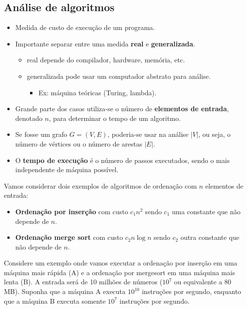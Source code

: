 \subsection{Análise de algoritmos}

\begin{itemize}
\item Medida de custo de execução de um programa.
\item Importante separar entre uma medida {\bf real}  e {\bf generalizada}.
	\begin{itemize}
	\item real depende do compilador, hardware, memória, etc.
	\item generalizada pode usar um computador abstrato para análise.
		\begin{itemize}
		\item Ex: máquina teóricas (Turing, lambda).
		\end{itemize}
	\end{itemize}
\item Grande parte dos casos utiliza-se o número de {\bf elementos de entrada}, denotado $n$, para
determinar o tempo de um algoritmo.
\item Se fosse um grafo $G = (V, E)$, poderia-se usar na análise $|V|$, ou seja, o número de vértices ou
o número de arestas $|E|$.
\item O {\bf tempo de execução} é o número de passos executados, sendo o mais independente de 
máquina possível.
\end{itemize}

Vamos considerar dois exemplos de algoritmos de ordenação com $n$ elementos de entrada:
\begin{itemize}
\item {\bf Ordenação por inserção} com custo $c_1 n^2$ sendo $c_1$ uma constante que não depende de $n$.
\item {\bf Ordenação merge sort} com custo $c_2 n \log n$ sendo $c_2$ outra constante que não depende de $n$.
\end{itemize}

Considere um exemplo onde vamos executar a ordenação por inserção em uma
máquina mais rápida (A) e a ordenação por mergesort em uma máquina mais lenta
(B).
A entrada será de 10 milhões de números ($10^7$ ou equivalente a $80$ MB).
Suponha que a máquina A executa $10^{10}$ instruções por segundo, enquanto que a máquina B executa
somente $10^7$ instruções por segundo. 

